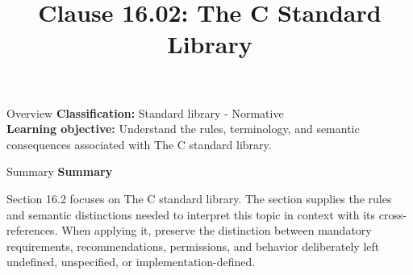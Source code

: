 \documentclass[10pt,letterpaper]{article}
\title{Clause 16.02: The C Standard Library}
\author{}
\date{}
\begin{document}
\maketitle
\begin{CornellOverviewBox}{Overview}
\textbf{Classification:} Standard library - Normative\\[2pt]
\textbf{Learning objective:} Understand the rules, terminology, and semantic consequences associated with The C standard library.
\end{CornellOverviewBox}\begin{CornellSummaryBox}{Summary}
{\sffamily\bfseries\color{Accent} Summary}\par\vspace{3pt}Section 16.2 focuses on The C standard library. The section supplies the rules and semantic distinctions needed to interpret this topic in context with its cross-references. When applying it, preserve the distinction between mandatory requirements, recommendations, permissions, and behavior deliberately left undefined, unspecified, or implementation-defined.
\end{CornellSummaryBox}
\end{document}
